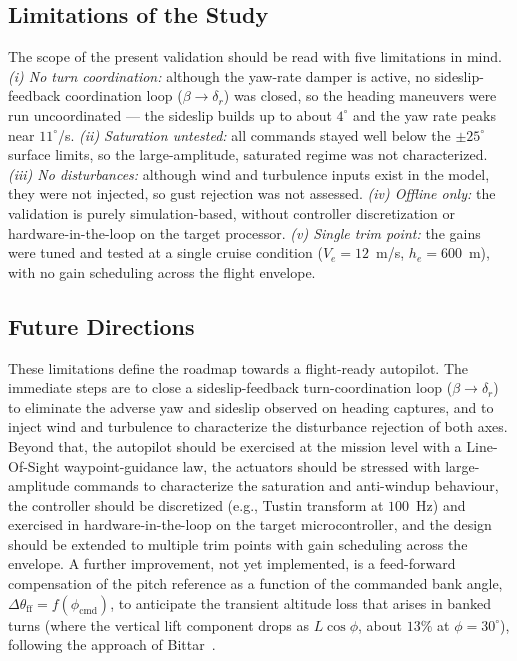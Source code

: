 \documentclass{ieeeaccess}
\begin{document}
\subsection{Limitations of the Study}

The scope of the present validation should be read with five limitations in mind. \textit{(i) No turn coordination:} although the yaw-rate damper is active, no sideslip-feedback coordination loop ($\beta\!\to\!\delta_r$) was closed, so the heading maneuvers were run uncoordinated --- the sideslip builds up to about $4^\circ$ and the yaw rate peaks near $11^\circ$/s. \textit{(ii) Saturation untested:} all commands stayed well below the $\pm 25^\circ$ surface limits, so the large-amplitude, saturated regime was not characterized. \textit{(iii) No disturbances:} although wind and turbulence inputs exist in the model, they were not injected, so gust rejection was not assessed. \textit{(iv) Offline only:} the validation is purely simulation-based, without controller discretization or hardware-in-the-loop on the target processor. \textit{(v) Single trim point:} the gains were tuned and tested at a single cruise condition ($V_e = 12$~m/s, $h_e = 600$~m), with no gain scheduling across the flight envelope.

\subsection{Future Directions}

These limitations define the roadmap towards a flight-ready autopilot. The immediate steps are to close a sideslip-feedback turn-coordination loop ($\beta\!\to\!\delta_r$) to eliminate the adverse yaw and sideslip observed on heading captures, and to inject wind and turbulence to characterize the disturbance rejection of both axes. Beyond that, the autopilot should be exercised at the mission level with a Line-Of-Sight waypoint-guidance law, the actuators should be stressed with large-amplitude commands to characterize the saturation and anti-windup behaviour, the controller should be discretized (e.g., Tustin transform at $100$~Hz) and exercised in hardware-in-the-loop on the target microcontroller, and the design should be extended to multiple trim points with gain scheduling across the envelope. A further improvement, not yet implemented, is a feed-forward compensation of the pitch reference as a function of the commanded bank angle, $\Delta\theta_\text{ff} = f(\phi_\text{cmd})$, to anticipate the transient altitude loss that arises in banked turns (where the vertical lift component drops as $L\cos\phi$, about $13\%$ at $\phi = 30^\circ$), following the approach of Bittar~\cite{bittar2012arquitetura}.
\end{document}
